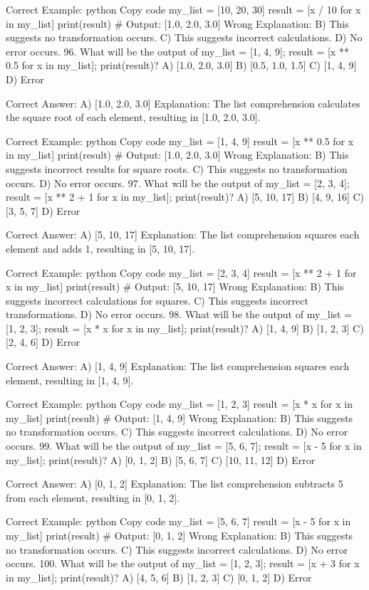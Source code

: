 Correct Example:
python
Copy code
my_list = [10, 20, 30]
result = [x / 10 for x in my_list]
print(result)  # Output: [1.0, 2.0, 3.0]
Wrong Explanation:
B) This suggests no transformation occurs.
C) This suggests incorrect calculations.
D) No error occurs.
96. What will be the output of my_list = [1, 4, 9]; result = [x ** 0.5 for x in my_list]; print(result)?
A) [1.0, 2.0, 3.0]
B) [0.5, 1.0, 1.5]
C) [1, 4, 9]
D) Error

Correct Answer: A) [1.0, 2.0, 3.0]
Explanation: The list comprehension calculates the square root of each element, resulting in [1.0, 2.0, 3.0].

Correct Example:
python
Copy code
my_list = [1, 4, 9]
result = [x ** 0.5 for x in my_list]
print(result)  # Output: [1.0, 2.0, 3.0]
Wrong Explanation:
B) This suggests incorrect results for square roots.
C) This suggests no transformation occurs.
D) No error occurs.
97. What will be the output of my_list = [2, 3, 4]; result = [x ** 2 + 1 for x in my_list]; print(result)?
A) [5, 10, 17]
B) [4, 9, 16]
C) [3, 5, 7]
D) Error

Correct Answer: A) [5, 10, 17]
Explanation: The list comprehension squares each element and adds 1, resulting in [5, 10, 17].

Correct Example:
python
Copy code
my_list = [2, 3, 4]
result = [x ** 2 + 1 for x in my_list]
print(result)  # Output: [5, 10, 17]
Wrong Explanation:
B) This suggests incorrect calculations for squares.
C) This suggests incorrect transformations.
D) No error occurs.
98. What will be the output of my_list = [1, 2, 3]; result = [x * x for x in my_list]; print(result)?
A) [1, 4, 9]
B) [1, 2, 3]
C) [2, 4, 6]
D) Error

Correct Answer: A) [1, 4, 9]
Explanation: The list comprehension squares each element, resulting in [1, 4, 9].

Correct Example:
python
Copy code
my_list = [1, 2, 3]
result = [x * x for x in my_list]
print(result)  # Output: [1, 4, 9]
Wrong Explanation:
B) This suggests no transformation occurs.
C) This suggests incorrect calculations.
D) No error occurs.
99. What will be the output of my_list = [5, 6, 7]; result = [x - 5 for x in my_list]; print(result)?
A) [0, 1, 2]
B) [5, 6, 7]
C) [10, 11, 12]
D) Error

Correct Answer: A) [0, 1, 2]
Explanation: The list comprehension subtracts 5 from each element, resulting in [0, 1, 2].

Correct Example:
python
Copy code
my_list = [5, 6, 7]
result = [x - 5 for x in my_list]
print(result)  # Output: [0, 1, 2]
Wrong Explanation:
B) This suggests no transformation occurs.
C) This suggests incorrect calculations.
D) No error occurs.
100. What will be the output of my_list = [1, 2, 3]; result = [x + 3 for x in my_list]; print(result)?
A) [4, 5, 6]
B) [1, 2, 3]
C) [0, 1, 2]
D) Error

